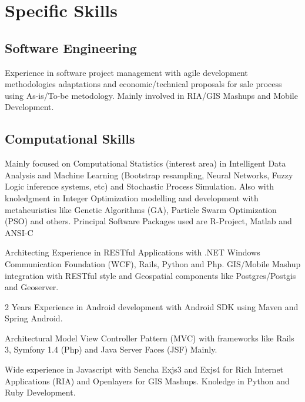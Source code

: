 \section{Specific Skills}
\subsection{Software Engineering}
	{Experience in software project management with agile development methodologies adaptations and economic/technical proposals for sale process using As-is/To-be metodology. Mainly involved in RIA/GIS Mashups and Mobile Development.}
	
\subsection{Computational Skills}
	{Mainly focused on Computational Statistics (interest area) in Intelligent Data Analysis and Machine Learning (Bootstrap resampling, Neural Networks, Fuzzy Logic inference systems, etc)  and Stochastic Process Simulation. Also 
	with knoledgment in Integer Optimization modelling and development with metaheuristics like Genetic Algorithms (GA), Particle Swarm Optimization (PSO) and others. Principal Software Packages used are R-Project, Matlab and ANSI-C}

	{Architecting Experience in RESTful Applications with .NET Windows Communication Foundation (WCF), Rails, Python and Php. GIS/Mobile Mashup integration with RESTful style and Geospatial components like Postgres/Postgis and Geoserver.  }

	{2 Years Experience in Android development with Android SDK using Maven and Spring Android.}

	{Architectural Model View Controller Pattern (MVC) with frameworks like Rails 3, Symfony 1.4 (Php) and Java Server Faces (JSF) Mainly.}

	{Wide experience in Javascript with Sencha Exjs3 and Exjs4 for Rich Internet Applications (RIA) and Openlayers for GIS Mashups. Knoledge in Python and Ruby Development.}

	

	



